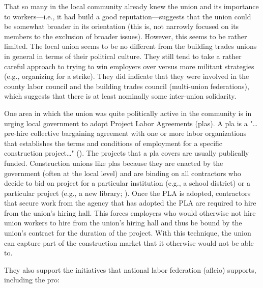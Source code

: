 \documentclass[12pt]{article}
\begin{document}
That so many in the local community already knew the union and its importance to workers---i.e., it had build a good reputation---suggests that the union could be somewhat broader in its orientation (this is, not narrowly focused on its members to the exclusion of broader issues). However, this seems to be rather limited. The local union seems to be no different from the building trades unions in general in terms of their political culture. They still tend to take a rather careful approach to trying to win employers over versus more militant strategies (e.g., organizing for a strike). They did indicate that they were involved in the county labor council and the building trades council (multi-union federations), which suggests that there is at least nominally some inter-union solidarity.


One area in which the union was quite politically active in the community is in urging local government to adopt Project Labor Agreements (\acrshort{pla}s). A \acrfull{pla} is a "\ldots{}pre-hire collective bargaining agreement with one or more labor organizations that establishes the terms and conditions of employment for a specific construction project\ldots{}" (\cite{officeofthepresssecretaryExecutiveOrder135022009}). The projects that a \acrshort{pla} covers  are usually publically funded. Construction unions like \acrshort{pla}s because they are enacted by the government (often at the local level) and are binding on all contractors who decide to bid on project for a particular institution (e.g., a school district) or a particular project (e.g., a new library; \cite{kotlerProjectLaborAgreements2009, johnston-doddsConstructingCaliforniaReview2001}). Once the PLA is adopted, contractors that secure work from the agency that has adopted the PLA are required to hire from the union's hiring hall. This forces employers who would otherwise not hire union workers to hire from the union's hiring hall and thus be bound by the union's contract for the duration of the project. With this technique, the union can capture part of the construction market that it otherwise would not be able to. 


They also support the initiatives that national labor federation (\acrshort{aflcio}) supports, including the \acrshort{pro}:
\end{document}
